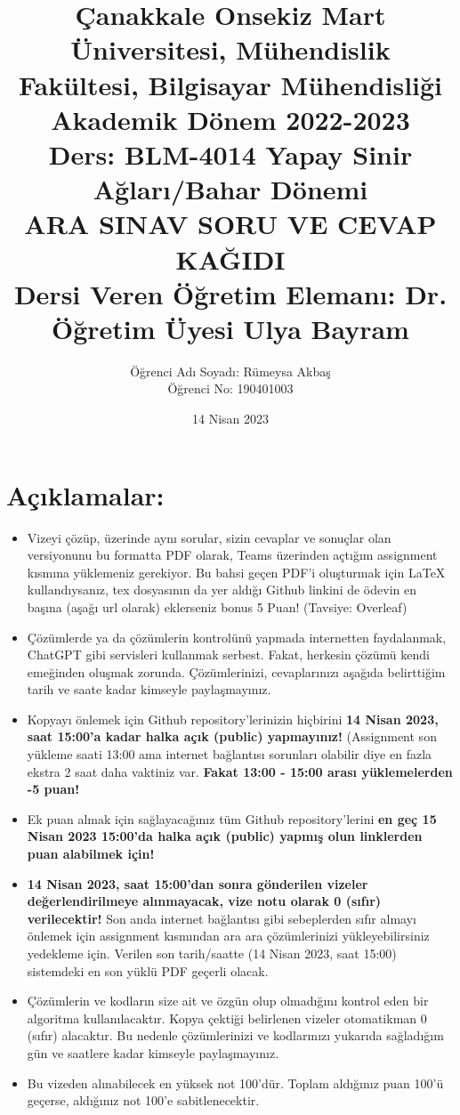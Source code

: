 \documentclass[11pt]{article}
\title{Çanakkale Onsekiz Mart Üniversitesi, Mühendislik Fakültesi, Bilgisayar Mühendisliği Akademik Dönem 2022-2023\\
Ders: BLM-4014 Yapay Sinir Ağları/Bahar Dönemi\\ 
ARA SINAV SORU VE CEVAP KAĞIDI\\
Dersi Veren Öğretim Elemanı: Dr. Öğretim Üyesi Ulya Bayram}
\author{%
\begin{minipage}{\textwidth}
\raggedright
Öğrenci Adı Soyadı: Rümeysa Akbaş\\ %
Öğrenci No: 190401003
\end{minipage}%
}
\date{14 Nisan 2023}
\begin{document}
\maketitle

\vspace{-.5in}
\section*{Açıklamalar:}
\begin{itemize}
    \item Vizeyi çözüp, üzerinde aynı sorular, sizin cevaplar ve sonuçlar olan versiyonunu bu formatta PDF olarak, Teams üzerinden açtığım assignment kısmına yüklemeniz gerekiyor. Bu bahsi geçen PDF'i oluşturmak için LaTeX kullandıysanız, tex dosyasının da yer aldığı Github linkini de ödevin en başına (aşağı url olarak) eklerseniz bonus 5 Puan! (Tavsiye: Overleaf)
    \item Çözümlerde ya da çözümlerin kontrolünü yapmada internetten faydalanmak, ChatGPT gibi servisleri kullanmak serbest. Fakat, herkesin çözümü kendi emeğinden oluşmak zorunda. Çözümlerinizi, cevaplarınızı aşağıda belirttiğim tarih ve saate kadar kimseyle paylaşmayınız. 
    \item Kopyayı önlemek için Github repository'lerinizin hiçbirini \textbf{14 Nisan 2023, saat 15:00'a kadar halka açık (public) yapmayınız!} (Assignment son yükleme saati 13:00 ama internet bağlantısı sorunları olabilir diye en fazla ekstra 2 saat daha vaktiniz var. \textbf{Fakat 13:00 - 15:00 arası yüklemelerden -5 puan!}
    \item Ek puan almak için sağlayacağınız tüm Github repository'lerini \textbf{en geç 15 Nisan 2023 15:00'da halka açık (public) yapmış olun linklerden puan alabilmek için!}
    \item \textbf{14 Nisan 2023, saat 15:00'dan sonra gönderilen vizeler değerlendirilmeye alınmayacak, vize notu olarak 0 (sıfır) verilecektir!} Son anda internet bağlantısı gibi sebeplerden sıfır almayı önlemek için assignment kısmından ara ara çözümlerinizi yükleyebilirsiniz yedekleme için. Verilen son tarih/saatte (14 Nisan 2023, saat 15:00) sistemdeki en son yüklü PDF geçerli olacak.
    \item Çözümlerin ve kodların size ait ve özgün olup olmadığını kontrol eden bir algoritma kullanılacaktır. Kopya çektiği belirlenen vizeler otomatikman 0 (sıfır) alacaktır. Bu nedenle çözümlerinizi ve kodlarınızı yukarıda sağladığım gün ve saatlere kadar kimseyle paylaşmayınız.
    \item Bu vizeden alınabilecek en yüksek not 100'dür. Toplam aldığınız puan 100'ü geçerse, aldığınız not 100'e sabitlenecektir.

\end{itemize}
\end{document}
